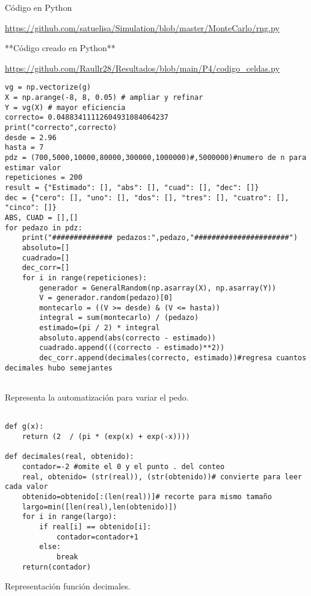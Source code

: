 \documentclass{article}
\begin{document}
 Código en Python 

\url{https://github.com/satuelisa/Simulation/blob/master/MonteCarlo/rng.py}

**Código creado en Python**

\url{https://github.com/Raullr28/Resultados/blob/main/P4/codigo_celdas.py}
\renewcommand{\listingscaption}{Código}

\begin{listing}[H]
\begin{verbatim}
vg = np.vectorize(g)
X = np.arange(-8, 8, 0.05) # ampliar y refinar
Y = vg(X) # mayor eficiencia
correcto= 0.04883411112604931084064237
print("correcto",correcto)
desde = 2.96 
hasta = 7
pdz = (700,5000,10000,80000,300000,1000000)#,5000000)#numero de n para estimar valor
repeticiones = 200
result = {"Estimado": [], "abs": [], "cuad": [], "dec": []}
dec = {"cero": [], "uno": [], "dos": [], "tres": [], "cuatro": [], "cinco": []}
ABS, CUAD = [],[]
for pedazo in pdz:
    print("############## pedazos:",pedazo,"######################")
    absoluto=[]
    cuadrado=[]
    dec_corr=[]
    for i in range(repeticiones):
        generador = GeneralRandom(np.asarray(X), np.asarray(Y))
        V = generador.random(pedazo)[0]
        montecarlo = ((V >= desde) & (V <= hasta))
        integral = sum(montecarlo) / (pedazo)
        estimado=(pi / 2) * integral
        absoluto.append(abs(correcto - estimado))
        cuadrado.append(((correcto - estimado)**2))
        dec_corr.append(decimales(correcto, estimado))#regresa cuantos decimales hubo semejantes


  \end{verbatim}
  \label{lst:fibo}
  \caption{Representa la automatización para variar el pedo.}
\end{listing}
\renewcommand{\listingscaption}{Código}
\begin{listing}[H]

\begin{verbatim}
 
def g(x):
    return (2  / (pi * (exp(x) + exp(-x))))

def decimales(real, obtenido):
    contador=-2 #omite el 0 y el punto . del conteo
    real, obtenido= (str(real)), (str(obtenido))# convierte para leer cada valor
    obtenido=obtenido[:(len(real))]# recorte para mismo tamaño
    largo=min([len(real),len(obtenido)])
    for i in range(largo):
        if real[i] == obtenido[i]:
            contador=contador+1
        else:
            break
    return(contador)
  \end{verbatim}
  \label{lst:fibo}
  \caption{Representación función decimales.}
\end{listing}
\end{document}

